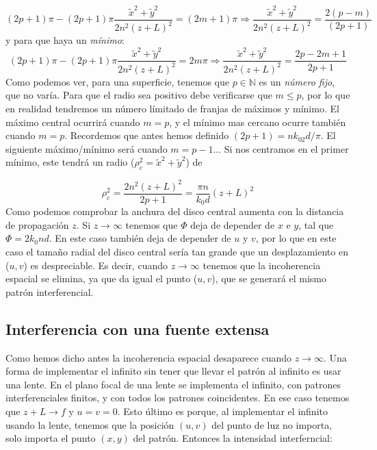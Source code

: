 \documentclass[12pt,a4paper]{book}
\numberwithin{equation}{section}
\numberwithin{figure}{section}
\newcommand{\1}{_{(1)}}
\newcommand{\2}{_{(2)}}
\theoremstyle{definition}
\begin{document}
\begin{equation}
(2p+1)\pi - (2p+1)\pi \frac{\tilde{x}^2 + \tilde{y}^2}{2n^2(z+L)^2} = (2m+1)\pi \Rightarrow \frac{\tilde{x}^2 + \tilde{y}^2}{2n^2(z+L)^2} = \frac{2(p-m)}{(2p+1)}
\end{equation}
y para que haya un \textit{mínimo}:
\begin{equation}
(2p+1)\pi - (2p+1)\pi \frac{\tilde{x}^2 + \tilde{y}^2}{2n^2(z+L)^2} = 2m\pi \Rightarrow \frac{\tilde{x}^2 + \tilde{y}^2}{2n^2(z+L)^2} = \frac{2p-2m+1}{2p+1}
\end{equation}
Como podemos ver, para una superficie, tenemos que $p\in\mathbb{N}$ es un \textit{número fijo}, que no varía. Para que el radio sea positivo debe verificarse que $m\leq p$, por lo que en realidad tendremos un número límitado de franjas de máximos y mínimo. El máximo central ocurrirá cuando $m=p$, y el mínimo mas cercano ocurre también cuando $m=p$. Recordemos que antes hemos definido $(2p+1)=nk_02d/\pi$. El siguiente máximo/mínimo será cuando $m=p-1$... Si nos centramos en el primer mínimo, este tendrá un radio ($\rho_c^2=\tilde{x}^2+\tilde{y}^2$) de

\begin{equation}
\rho_c^2 = \frac{2n^2(z+L)^2}{2p+1} = \frac{ \pi n}{k_0d} (z+L)^2
\end{equation}
Como podemos comprobar la anchura del disco central aumenta con la distancia de propagación $z$.  Si $z\rightarrow\infty$ tenemos que $\Phi$ deja de depender de $x$ e $y$, tal que $\Phi=2k_0 nd$. En este caso también deja de depender de $u$ y $v$, por lo que en este caso el tamaño radial del disco central sería tan grande que un desplazamiento en ($u,v$) es despreciable. Es decir, cuando $z\rightarrow\infty$ tenemos que la incoherencia espacial se elimina, ya que da igual el punto ($u,v$), que se generará el mismo patrón interferencial.

\subsection{Interferencia con una fuente extensa}
 
Como hemos dicho antes la incoherencia espacial desaparece cuando $z\rightarrow\infty$. Una forma de implementar el infinito sin tener que llevar el patrón al infinito es usar una lente. En el plano focal de una lente se implementa el infinito, con patrones interferenciales finitos, y con todos los patrones coincidentes. En ese caso tenemos que $z+L \rightarrow f$ y $u=v=0$. Esto último es porque, al implementar el infinito usando la lente, tenemos que la posición $(u,v)$ del punto de luz no importa, solo importa el punto $(x,y)$ del patrón. Entonces la intensidad interferncial:
 
\end{document}
